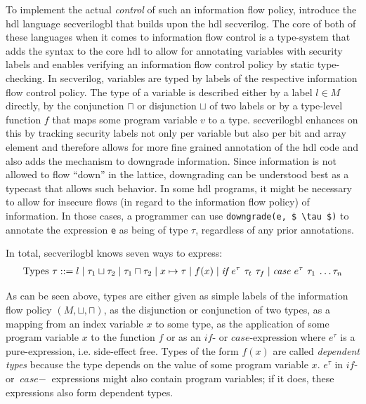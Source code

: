 To implement the actual \textit{control} of such an information flow policy, \citeauthor{Ferraiuolo17} introduce the \gls{hdl} language \gls{secverilogbl} that builds upon the \gls{hdl} \gls{secverilog}.
The core of both of these languages when it comes to information flow control is a type-system that adds the syntax to the core \gls{hdl} to allow for annotating variables with security labels and enables verifying an information flow control policy by static type-checking.
In \gls{secverilog}, variables are typed by labels of the respective information flow control policy.
The type of a variable is described either by a label $ l \in M $ directly, by the conjunction $ \sqcap $ or disjunction $ \sqcup $ of two labels or by a type-level function $ f $ that maps some program variable $ v $ to a type.
\gls{secverilogbl} enhances on this by tracking security labels not only per variable but also per bit and array element and therefore allows for more fine grained annotation of the \gls{hdl} code and also adds the mechanism to downgrade information.
Since information is not allowed to flow \enquote{down} in the lattice, downgrading can be understood best as a typecast that allows such behavior.
In some \gls{hdl} programs, it might be necessary to allow for insecure flows (in regard to the information flow policy) of information.
In those cases, a programmer can use \lstinline[mathescape]{downgrade(e, $ \tau $)} to annotate the expression \lstinline{e} as being of type $ \tau $, regardless of any prior annotations.

In total, \gls{secverilogbl} knows seven ways to express:
\begin{align*}
    \text{Types } \tau ::= l \mid \tau_1 \sqcup \tau_2 \mid \tau_1 \sqcap \tau_2 \mid x \mapsto \tau \mid f(x) \mid \textit{if $ e^\tau $ $ \tau_t $ $ \tau_f $} \mid \textit{case $ e^\tau $ $ \tau_1 $ \dots $ \tau_n $}
\end{align*}

As can be seen above, types are either given as simple labels of the information flow policy $ (M, \sqcup, \sqcap) $, as the disjunction or conjunction of two types, as a mapping from an index variable $ x $ to some type, as the application of some program variable $ x $ to the function $ f $ or as an $ \textit{if} $- or $ \textit{case} $-expression where $ e^\tau $ is a pure-expression, i.e. side-effect free.
Types of the form $ f(x) $ are called \textit{dependent types} because the type depends on the value of some program variable $ x $.
$ e^\tau $ in $ \textit{if} $- or $ \textit{case}- $ expressions might also contain program variables; if it does, these expressions also form dependent types.

